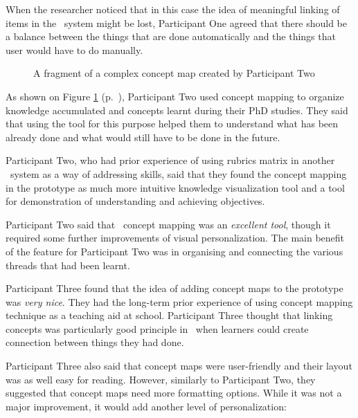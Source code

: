 When the researcher noticed that in this case the idea of meaningful linking of
items in the \ep~system might be lost, Participant One agreed that there should
be a balance between the things that are done automatically and the things that
user would have to do manually.

\begin{figure}[htb]
\centering
\setlength\fboxsep{0pt}
\setlength\fboxrule{0.5pt}
\caption{A fragment of a complex concept map created by Participant Two}
\label{fig:p2map}
\end{figure}

As shown on Figure \ref{fig:p2map} (p.~\pageref{fig:p2map}), Participant Two
used concept mapping to organize knowledge accumulated and concepts learnt during
their PhD studies. They said that using the tool for this purpose helped them to
understand what has been already done and what would still have to be done in
the future.

Participant Two, who had prior experience of using rubrics matrix in another
\ep~system as a way of addressing \LLLs skills, said that they found the concept
mapping in the prototype as much more intuitive knowledge visualization tool
and a tool for demonstration of understanding and achieving objectives.

Participant Two said that \ep~concept mapping was an \textit{excellent tool},
though it required some further improvements of visual personalization. The main
benefit of the feature for Participant Two was in organising and connecting the
various threads that had been learnt. 


Participant Three found that the idea of adding concept maps to the prototype
was \textit{very nice}. They had the long-term prior experience of using concept
mapping technique as a teaching aid at school. Participant Three thought that
linking concepts was particularly good principle in \ep~when learners could
create connection between things they had done.

Participant Three also said that concept maps were user-friendly and their
layout was as well easy for reading. However, similarly to Participant Two, they
suggested that concept maps need more formatting options. While it was not a
major improvement, it would add another level of personalization:

